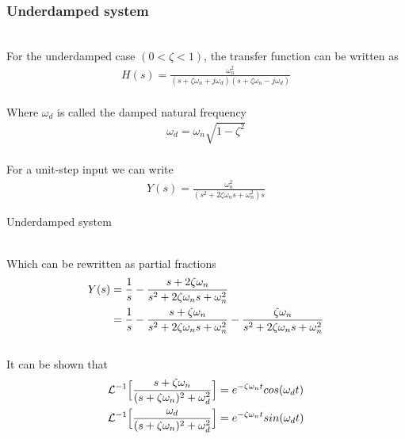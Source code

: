 \begin{frame}
\frametitle{Underdamped system}
\\For the underdamped case $(0< \zeta< 1)$, the transfer function can be written as
\vspace{-0.25cm}
\\ 
\begin{align*}
H(s)=\frac{\omega_n ^2}{(s+\zeta\omega_n+j\omega_d)(s+\zeta\omega_n-j\omega_d)}
\end{align*}
\pause
\\Where $\omega_d$ is called the damped natural frequency
\\ 
\begin{align*}
\omega_d = \omega_n\sqrt{1-\zeta^2}
\end{align*}
\pause
\vspace{-0.15cm}
\\ For a unit-step input we can write
\vspace{-0.25cm}
\\ 
\begin{align*}
Y(s)=\frac{\omega_n ^2}{(s^2+2\zeta\omega_n s+\omega_n ^2)s}
\end{align*}
\end{frame}

\begin{frame}{Underdamped system}

\\ Which can be rewritten as partial fractions\\
\vspace{-0.5cm}
\begin{align*}
Y(s)&=\frac{1}{s} -\frac{s+2\zeta\omega_n}{s^2+2\zeta\omega_n s+ \omega_n ^2} \\ \vspace{2cm}
&= \frac{1}{s} -\frac{s+\zeta\omega_n}{s^2+2\zeta\omega_n s+ \omega_n ^2} -\frac{\zeta\omega_n}{s^2+2\zeta\omega_n s+ \omega_n ^2}
\end{align*}
\pause
\\ It can be shown that
\\ 
\begin{align*}
\mathcal{L}^{-1}\Big[\frac{s+\zeta\omega_n}{(s+\zeta\omega_n)^2+\omega_d ^2}\Big]&= e^{-\zeta\omega_n t}cos(\omega_d t)\\  \vspace{2cm}
\mathcal{L}^{-1}\Big[\frac{\omega_d}{(s+\zeta\omega_n)^2+\omega_d ^2}\Big]&= e^{-\zeta\omega_n t}sin(\omega_d t)
\end{align*}
\end{frame}



